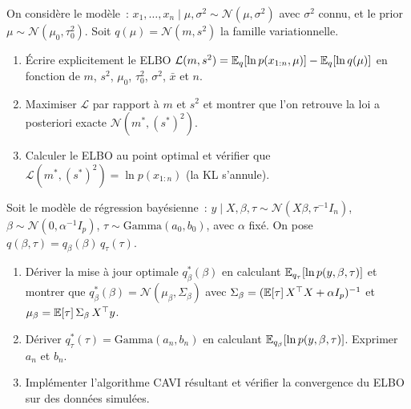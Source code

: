 \begin{exercice}
On consid\`ere le mod\`ele~:
$x_1, \ldots, x_n \mid \mu, \sigma^2 \sim \mathcal{N}(\mu, \sigma^2)$
avec $\sigma^2$ connu, et le prior $\mu \sim \mathcal{N}(\mu_0, \tau_0^2)$.
Soit $q(\mu) = \mathcal{N}(m, s^2)$ la famille variationnelle.
\begin{enumerate}
  \item \'Ecrire explicitement le ELBO $\mathcal{L}(m, s^2) =
        \mathbb{E}_q[\ln p(x_{1:n}, \mu)] - \mathbb{E}_q[\ln q(\mu)]$ en fonction de
        $m$, $s^2$, $\mu_0$, $\tau_0^2$, $\sigma^2$, $\bar{x}$ et $n$.
  \item Maximiser $\mathcal{L}$ par rapport \`a $m$ et $s^2$ et montrer
        que l'on retrouve la loi a posteriori exacte
        $\mathcal{N}(m^*, (s^*)^2)$.
  \item Calculer le ELBO au point optimal et v\'erifier que
        $\mathcal{L}(m^*, (s^*)^2) = \ln p(x_{1:n})$ (la KL s'annule).
\end{enumerate}
\end{exercice}

\begin{exercice}
Soit le mod\`ele de r\'egression bay\'esienne~:
$y \mid X, \beta, \tau \sim \mathcal{N}(X\beta, \tau^{-1} I_n)$,
$\beta \sim \mathcal{N}(0, \alpha^{-1} I_p)$,
$\tau \sim \mathrm{Gamma}(a_0, b_0)$, avec $\alpha$ fix\'e.
On pose $q(\beta, \tau) = q_\beta(\beta)\,q_\tau(\tau)$.
\begin{enumerate}
  \item D\'eriver la mise \`a jour optimale $q_\beta^*(\beta)$ en calculant
        $\mathbb{E}_{q_\tau}[\ln p(y, \beta, \tau)]$ et montrer que
        $q_\beta^*(\beta) = \mathcal{N}(\mu_\beta, \Sigma_\beta)$
        avec $\Sigma_\beta = (\mathbb{E}[\tau]\,X^\top X + \alpha I_p)^{-1}$
        et $\mu_\beta = \mathbb{E}[\tau]\,\Sigma_\beta\,X^\top y$.
  \item D\'eriver $q_\tau^*(\tau) = \mathrm{Gamma}(a_n, b_n)$ en
        calculant $\mathbb{E}_{q_\beta}[\ln p(y, \beta, \tau)]$.
        Exprimer $a_n$ et $b_n$.
  \item Impl\'ementer l'algorithme CAVI r\'esultant et v\'erifier la
        convergence du ELBO sur des donn\'ees simul\'ees.
\end{enumerate}
\end{exercice}

